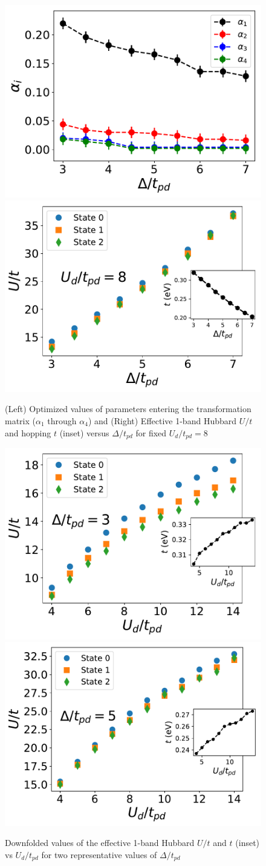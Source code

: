 \begin{figure}[]
\centering
\includegraphics[width=0.49\linewidth]{./Figures/Hyb_vs_ep_Ud_8.pdf}
\includegraphics[width=0.49\linewidth]{./Figures/U_and_hopping_combined_vs_ep_Ud_8.pdf}
\caption{(Left) Optimized values of parameters entering the transformation matrix 
($\alpha_1$ through $\alpha_4$) and (Right) Effective 1-band Hubbard $U/t$ and hopping $t$ (inset) 
versus $\Delta/t_{pd}$ for fixed $U_{d}/t_{pd}=8$}
\label{fig:hamfitepdvary} 
\end{figure}	

\begin{figure}[]
\centering
\includegraphics[width=0.48\linewidth]{./Figures/U_and_hopping_combined_vs_Ud_ep_3.pdf}
\includegraphics[width=0.50\linewidth]{./Figures/U_and_hopping_combined_vs_Ud_ep_5.pdf}
\caption{Downfolded values of the effective 1-band Hubbard $U/t$ and $t$ (inset) 
vs $U_d/t_{pd}$ for two representative values of $\Delta/t_{pd}$}
\label{fig:hamfitUdvary} 
\end{figure}	
 
